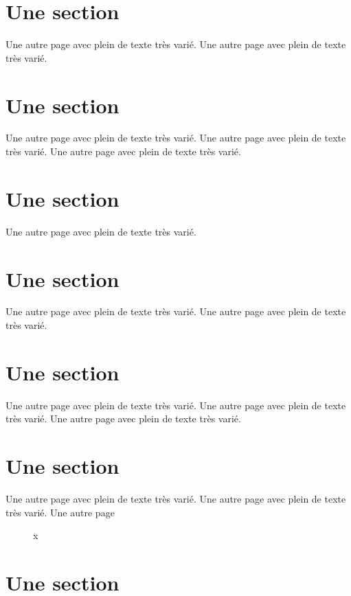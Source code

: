\documentclass[11pt]{thesul}
\begin{document}
\section{Une section}

Une autre page avec plein de texte très varié.
Une autre page avec plein de texte très varié.

\section{Une section}

Une autre page avec plein de texte très varié.
Une autre page avec plein de texte très varié.
Une autre page avec plein de texte très varié.

\section{Une section}

Une autre page avec plein de texte très varié.

\section{Une section}

Une autre page avec plein de texte très varié.
Une autre page avec plein de texte très varié.

\section{Une section}

Une autre page avec plein de texte très varié.
Une autre page avec plein de texte très varié.
Une autre page avec plein de texte très varié.

\section{Une section}

Une autre page avec plein de texte très varié.
Une autre page avec plein de texte très varié.
Une autre page

\begin{figure}[htb]
\caption{x\label{rintintin}}
\end{figure}

\section{Une section}
\end{document}
